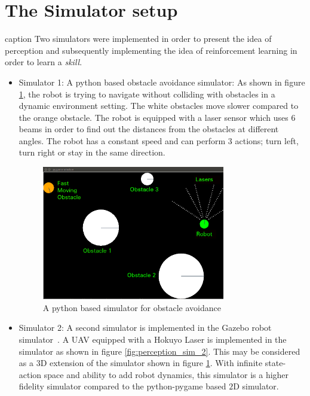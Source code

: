 \documentclass[12pt]{report}
\begin{document}
\section{The Simulator setup}caption
\label{sims}
Two simulators were implemented in order to present the idea of perception and subsequently implementing the idea of reinforcement learning in order to learn a \textit{skill}.
\begin{itemize}
\item Simulator 1: A python based obstacle avoidance simulator: As shown in figure \ref{fig:perception_sim_1}, the robot is trying to navigate without colliding with obstacles in a dynamic environment setting. The white obstacles move slower compared to the orange obstacle. The robot is equipped with a laser sensor which uses $6$ beams in order to find out the distances from the obstacles at different angles. The robot has a constant speed and can perform $3$ actions; turn left, turn right or stay in the same direction. 

\begin{figure}[htp]
	\centering
	\includegraphics[width=8cm]{perception_sim_1.png}
	\caption {A python based simulator for obstacle avoidance}
   \label{fig:perception_sim_1}
\end{figure}

\item Simulator 2: A second simulator is implemented in the Gazebo robot simulator~\cite{koenig2004design}. A UAV equipped with a Hokuyo Laser is implemented in the simulator as shown in figure \ref{fig:perception_sim_2}. This may be considered as a $3$D extension of the simulator shown in figure \ref{fig:perception_sim_1}. With infinite state-action space and ability to add robot dynamics, this simulator is a higher fidelity simulator compared to the python-pygame based $2$D simulator. 


\end{itemize}
\end{document}
